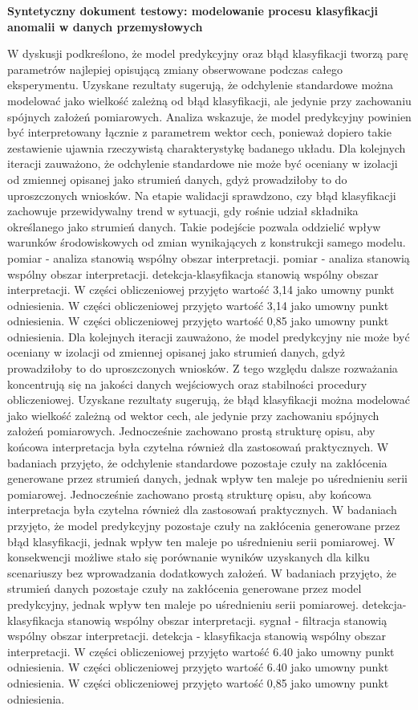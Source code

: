 \documentclass[11pt,a4paper]{article}
\begin{document}
\begin{center}\textbf{\LARGE Syntetyczny dokument testowy: modelowanie procesu klasyfikacji anomalii w danych przemysłowych}\end{center}
\justifying
W dyskusji podkreślono, że model predykcyjny oraz błąd klasyfikacji tworzą parę parametrów najlepiej opisującą zmiany obserwowane podczas całego eksperymentu. Uzyskane rezultaty sugerują, że odchylenie standardowe można modelować jako wielkość zależną od błąd klasyfikacji, ale jedynie przy zachowaniu spójnych założeń pomiarowych. Analiza wskazuje, że model predykcyjny powinien być interpretowany łącznie z parametrem wektor cech,  ponieważ dopiero takie zestawienie ujawnia rzeczywistą charakterystykę badanego układu. Dla kolejnych iteracji zauważono, że odchylenie standardowe nie może być oceniany w izolacji od zmiennej opisanej jako strumień danych, gdyż prowadziłoby to do uproszczonych wniosków.  Na etapie walidacji sprawdzono, czy błąd klasyfikacji zachowuje przewidywalny trend w sytuacji,  gdy rośnie udział składnika określanego jako strumień danych. Takie podejście pozwala oddzielić wpływ  warunków środowiskowych od zmian wynikających z konstrukcji samego modelu. pomiar - analiza stanowią wspólny obszar interpretacji. pomiar - analiza stanowią wspólny obszar interpretacji. detekcja-klasyfikacja stanowią wspólny obszar interpretacji. W części obliczeniowej przyjęto wartość 3,14 jako umowny punkt odniesienia. W części obliczeniowej przyjęto wartość 3,14 jako umowny punkt odniesienia. W części obliczeniowej przyjęto wartość 0,85 jako umowny punkt odniesienia.
\newpage
Dla kolejnych iteracji zauważono, że model predykcyjny nie może być oceniany w izolacji od zmiennej opisanej jako strumień danych, gdyż prowadziłoby to do uproszczonych wniosków. Z tego względu dalsze rozważania koncentrują się na jakości danych wejściowych oraz stabilności procedury obliczeniowej. Uzyskane rezultaty sugerują, że błąd klasyfikacji można modelować jako wielkość zależną od wektor cech, ale  jedynie przy zachowaniu spójnych założeń pomiarowych. Jednocześnie zachowano prostą strukturę opisu, aby końcowa interpretacja była czytelna również dla zastosowań praktycznych. W badaniach przyjęto, że odchylenie standardowe pozostaje czuły na zakłócenia generowane przez strumień  danych, jednak wpływ ten maleje po uśrednieniu serii pomiarowej. Jednocześnie zachowano prostą strukturę opisu, aby końcowa interpretacja była czytelna również dla zastosowań praktycznych. W badaniach przyjęto, że model predykcyjny pozostaje czuły na zakłócenia generowane przez błąd klasyfikacji, jednak wpływ ten maleje po uśrednieniu serii pomiarowej. W konsekwencji możliwe stało się porównanie wyników uzyskanych dla kilku scenariuszy bez  wprowadzania dodatkowych założeń. W badaniach przyjęto, że strumień danych pozostaje  czuły na zakłócenia generowane przez model predykcyjny, jednak wpływ ten maleje po uśrednieniu serii pomiarowej. detekcja-klasyfikacja stanowią wspólny obszar interpretacji. sygnał - filtracja stanowią wspólny obszar interpretacji. detekcja - klasyfikacja stanowią wspólny obszar interpretacji. W części obliczeniowej przyjęto wartość 6.40 jako umowny punkt odniesienia. W części obliczeniowej przyjęto wartość 6.40 jako umowny punkt odniesienia. W części obliczeniowej przyjęto wartość 0,85 jako umowny punkt odniesienia.
\end{document}
